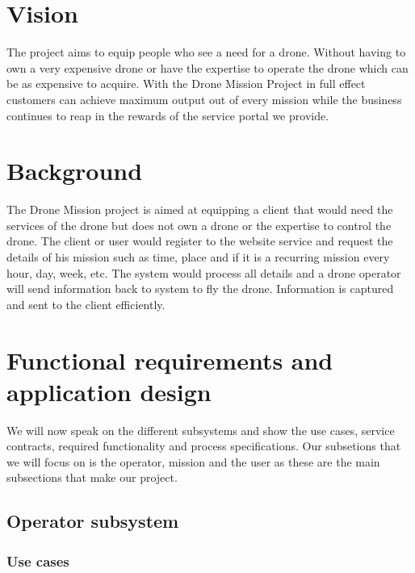 \documentclass{article}
\begin{document}
\section{Vision}
	The project aims to equip people who see a need for a drone. Without having to own a very expensive drone or have the expertise to operate the drone which can be as expensive to acquire. With the Drone Mission Project in full effect customers can achieve maximum output out of every mission while the business continues to reap in the rewards of the service portal we provide.

\section{Background}
	The Drone Mission project is aimed at equipping a client that would need the services of the drone but does not own a drone or the expertise to control the drone. The client or user would register to the website service and request the details of his mission such as time, place and if it is a recurring mission every hour, day, week, etc. The system would process all details and a drone operator will send information back to system to fly the drone. Information is captured and sent to the client efficiently.

\section{Functional requirements and application design}
We will now speak on the different subsystems and show the use cases, service contracts, required functionality and process specifications. Our subsetions that we will focus on is the operator, mission and the user as these are the main subsections that make our project.

\subsection{Operator subsystem}
	\subsubsection{Use cases}
\end{document}
